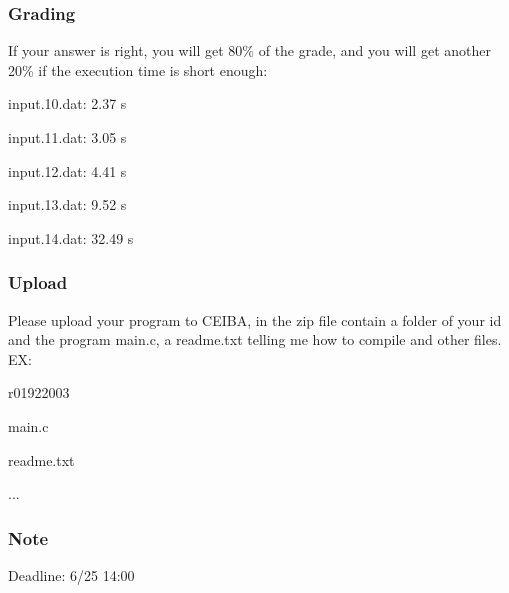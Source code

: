 \documentclass[12pt]{beamer}
\begin{document}
\begin{frame}
  \frametitle{Grading}
  If your answer is right, you will get 80\% of the grade, and you will get another 20\% if the execution time is short enough:
  \begin{itemize}
    {\item input.10.dat: 2.37 s}
    {\item input.11.dat: 3.05 s}
    {\item input.12.dat: 4.41 s}
    {\item input.13.dat: 9.52 s}
    {\item input.14.dat: 32.49 s}
  \end{itemize}
\end{frame}

\begin{frame}
  \frametitle{Upload}
  Please upload your program to CEIBA, in the zip file contain a folder of your id and the program main.c, a readme.txt telling me how to compile and other files.\\
  EX:\\
  \begin{itemize}
    {\item r01922003}
          \begin{itemize}
            {\item main.c}
            {\item readme.txt}
            {\item ...}
          \end{itemize}
  \end{itemize}
\end{frame}

\begin{frame}
  \frametitle{Note}
  \begin{itemize}
    {\item Deadline: 6/25 14:00}
  \end{itemize}
\end{frame}
\end{document}
